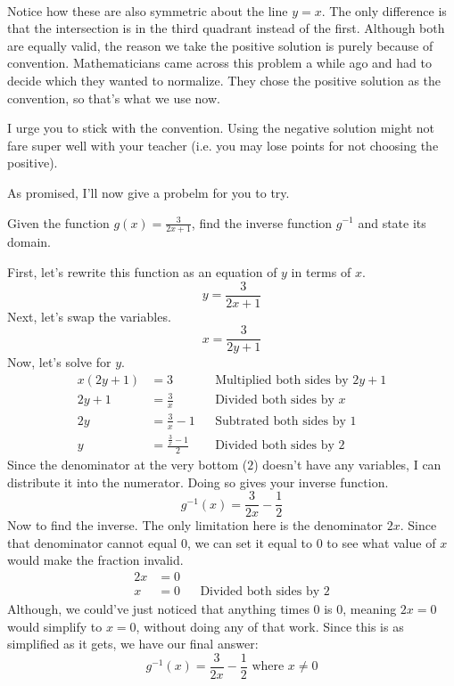 \\
Notice how these are also symmetric about the line $y = x$. The only difference is that the intersection is in the third quadrant instead of the first.
\clearpage
Although both are equally valid, the reason we take the positive solution is purely because of convention. Mathematicians came across this problem a while ago and had to decide which they wanted to normalize. They chose the positive solution as the convention, so that's what we use now.

I urge you to stick with the convention. Using the negative solution might not fare super well with your teacher (i.e. you may lose points for not choosing the positive).

As promised, I'll now give a probelm for you to try.
\begin{problem}
    Given the function $g(x) = \frac{3}{2x + 1}$, find the inverse function $g^{-1}$ and state its domain.
\end{problem}
\begin{solution}
    First, let's rewrite this function as an equation of $y$ in terms of $x$.
    \[
        y = \frac{3}{2x + 1}
    \]
    Next, let's swap the variables.
    \[
        x = \frac{3}{2y + 1}
    \]
    Now, let's solve for $y$.
    \begin{align*}
        x(2y + 1) &= 3 &&\text{Multiplied both sides by $2y + 1$} \\
        2y + 1 &= \frac{3}{x} && \text{Divided both sides by $x$} \\
        2y &= \frac{3}{x} - 1 && \text{Subtrated both sides by $1$} \\
        y &= \frac{\frac{3}{x} - 1}{2} && \text{Divided both sides by $2$}
    \end{align*}
    Since the denominator at the very bottom ($2$) doesn't have any variables, I can distribute it into the numerator. Doing so gives your inverse function.
    \[
        g^{-1}(x) = \frac{3}{2x} - \frac{1}{2}
    \]
    \clearpage
    Now to find the inverse. The only limitation here is the denominator $2x$. Since that denominator cannot equal $0$, we can set it equal to $0$ to see what value of $x$ would make the fraction invalid.
    \begin{align*}
        2x &= 0 \\
        x &= 0 && \text{Divided both sides by $2$}
    \end{align*}
    Although, we could've just noticed that anything times $0$ is $0$, meaning $2x = 0$ would simplify to $x = 0$, without doing any of that work. Since this is as simplified as it gets, we have our final answer:
    \[
        g^{-1}(x) = \frac{3}{2x} - \frac{1}{2} \text{ where } x \neq 0
    \]
\end{solution}